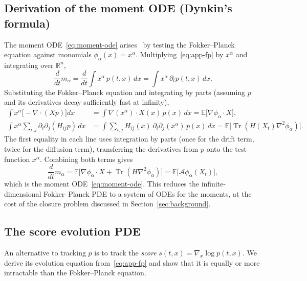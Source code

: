 \documentclass{article}
\newcommand{\R}{\mathbb{R}}
\newcommand{\E}{\mathbb{E}}
\newcommand{\Tr}{\operatorname{Tr}}
\theoremstyle{definition}
\begin{document}
\subsection{Derivation of the moment ODE (Dynkin's formula)}

The moment ODE~\eqref{eq:moment-ode} arises~\cite[Ch.~7]{oksendal2003} by testing the
Fokker--Planck equation against monomials $\phi_\alpha(x) = x^\alpha$.
Multiplying~\eqref{eq:app-fp} by $x^\alpha$ and integrating over $\R^n$,
\begin{equation}
    \frac{d}{dt} m_\alpha
    = \frac{d}{dt} \int x^\alpha \, p(t,x)\, dx
    = \int x^\alpha \, \partial_t p(t,x)\, dx.
\end{equation}
Substituting the Fokker--Planck equation and integrating by parts
(assuming $p$ and its derivatives decay sufficiently fast at infinity),
\begin{align}
    \int x^\alpha \bigl[-\nabla\cdot(Xp)\bigr] dx
    &= \int \nabla(x^\alpha) \cdot X(x)\, p(x)\, dx
    = \E\bigl[\nabla\phi_\alpha \cdot X\bigr], \\
    \int x^\alpha \sum_{i,j}\partial_i\partial_j(H_{ij}p)\, dx
    &= \int \sum_{i,j} H_{ij}(x)\,\partial_i\partial_j(x^\alpha)\, p(x)\, dx
    = \E\bigl[\Tr(H(X_t)\nabla^2\phi_\alpha)\bigr].
\end{align}
The first equality in each line uses integration by parts
(once for the drift term, twice for the diffusion term),
transferring the derivatives from $p$ onto the test function $x^\alpha$.
Combining both terms gives
\begin{equation}
    \frac{d}{dt} m_\alpha
    = \E\bigl[\nabla\phi_\alpha \cdot X + \Tr(H\nabla^2\phi_\alpha)\bigr]
    = \E\bigl[\mathcal{A}\phi_\alpha(X_t)\bigr],
\end{equation}
which is the moment ODE~\eqref{eq:moment-ode}.
This reduces the infinite-dimensional Fokker--Planck PDE to a
system of ODEs for the moments,
at the cost of the closure problem discussed in
Section~\ref{sec:background}.

\subsection{The score evolution PDE}\label{app:score-evo}

An alternative to tracking $p$ is to track the
\emph{score} $s(t,x) = \nabla_x \log p(t,x)$.
We derive its evolution equation from~\eqref{eq:app-fp}
and show that it is equally or more intractable than the Fokker--Planck equation.
\end{document}
